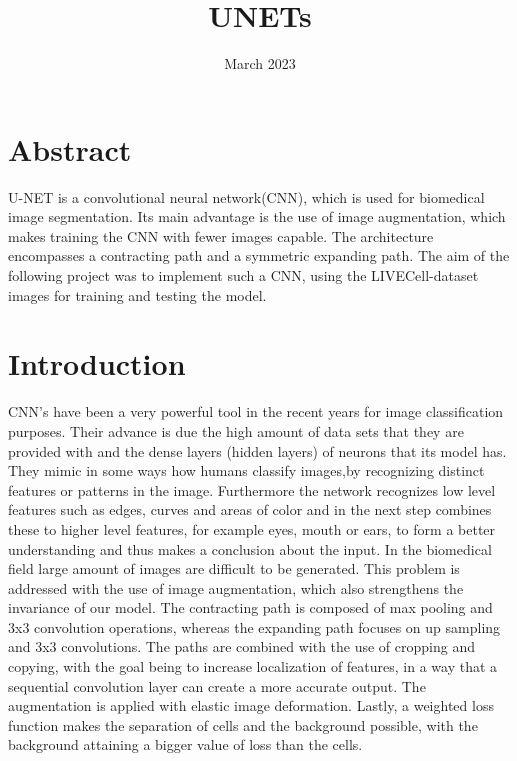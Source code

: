 \documentclass{article}
\title{UNETs}
\author{ }
\date{March 2023}
\begin{document}
\maketitle
\begin{multicols}{2}

\section{Abstract}
U-NET is a convolutional neural network(CNN), which is used for biomedical image segmentation.
Its main advantage is the use of image augmentation, which makes training the CNN with fewer images capable. The architecture encompasses a contracting path and a symmetric expanding path.
The aim of the following project was to implement such a CNN, using the LIVECell-dataset images for training and testing the model.

\maketitle
\section{Introduction}
CNN's have been a very powerful tool in the recent years for image classification purposes.
Their advance is due the high amount of data sets that they are provided with and the dense layers (hidden layers) of neurons that its model has. 
They mimic in some ways how humans classify images,by recognizing distinct features or patterns in the image.
Furthermore the network recognizes low level features such as edges,
curves and areas of color and in the next step combines these to higher level features, for example eyes, mouth or ears, to form a better
understanding and thus makes a conclusion about the input. In the biomedical field large amount of images are difficult to be generated.
This problem is addressed with the use of image augmentation, which also strengthens the invariance of our model. The contracting path is
composed of max pooling and 3x3 convolution operations, whereas the expanding path focuses on up sampling and 3x3 convolutions. 
The paths are combined with the use of cropping and copying, with the goal being to increase localization of features, in a way that
a sequential convolution layer can create a more accurate output. The augmentation is applied with elastic image deformation.
Lastly, a weighted loss function makes the separation of cells and the background possible, with the background attaining a bigger value
of loss than the cells.
\maketitle


\end{multicols}
\end{document}
